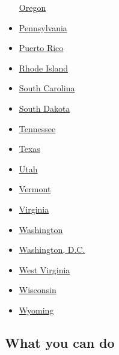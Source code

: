 \begin{itemize}
  \href{https://www.nytimes.com/interactive/2020/us/oregon-coronavirus-cases.html}{Oregon}
\item
  \href{https://www.nytimes.com/interactive/2020/us/pennsylvania-coronavirus-cases.html}{Pennsylvania}
\item
  \href{https://www.nytimes.com/interactive/2020/us/puerto-rico-coronavirus-cases.html}{Puerto
  Rico}
\item
  \href{https://www.nytimes.com/interactive/2020/us/rhode-island-coronavirus-cases.html}{Rhode
  Island}
\item
  \href{https://www.nytimes.com/interactive/2020/us/south-carolina-coronavirus-cases.html}{South
  Carolina}
\item
  \href{https://www.nytimes.com/interactive/2020/us/south-dakota-coronavirus-cases.html}{South
  Dakota}
\item
  \href{https://www.nytimes.com/interactive/2020/us/tennessee-coronavirus-cases.html}{Tennessee}
\item
  \href{https://www.nytimes.com/interactive/2020/us/texas-coronavirus-cases.html}{Texas}
\item
  \href{https://www.nytimes.com/interactive/2020/us/utah-coronavirus-cases.html}{Utah}
\item
  \href{https://www.nytimes.com/interactive/2020/us/vermont-coronavirus-cases.html}{Vermont}
\item
  \href{https://www.nytimes.com/interactive/2020/us/virginia-coronavirus-cases.html}{Virginia}
\item
  \href{https://www.nytimes.com/interactive/2020/us/washington-coronavirus-cases.html}{Washington}
\item
  \href{https://www.nytimes.com/interactive/2020/us/washington-dc-coronavirus-cases.html}{Washington,
  D.C.}
\item
  \href{https://www.nytimes.com/interactive/2020/us/west-virginia-coronavirus-cases.html}{West
  Virginia}
\item
  \href{https://www.nytimes.com/interactive/2020/us/wisconsin-coronavirus-cases.html}{Wisconsin}
\item
  \href{https://www.nytimes.com/interactive/2020/us/wyoming-coronavirus-cases.html}{Wyoming}
\end{itemize}

\hypertarget{what-you-can-do}{%
\subsection{What you can do}\label{what-you-can-do}}

